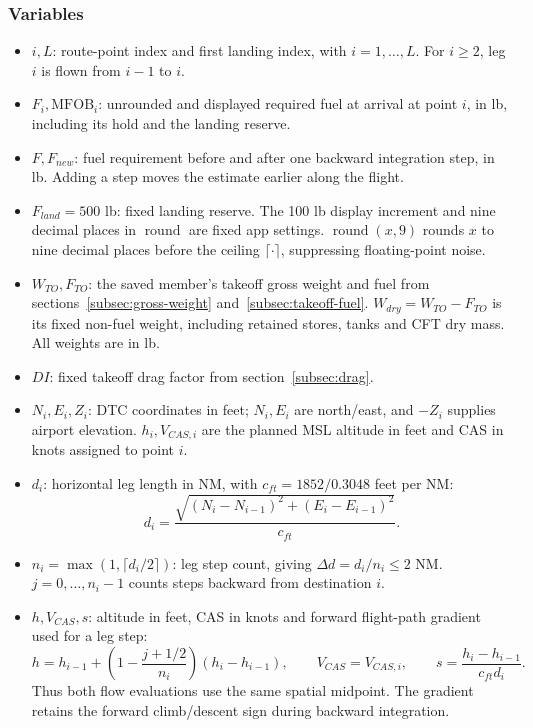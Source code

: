 \documentclass[10pt,a4paper]{amsart}
\DeclareMathOperator{\rnd}{round}
\begin{document}
\subsubsection*{Variables}
\begin{itemize}
\setlength{\itemsep}{0pt}
\setlength{\parsep}{0pt}
\item $i,L$: route-point index and first landing index, with
$i=1,\ldots,L$. For $i\geq2$, leg $i$ is flown from $i-1$ to $i$.
\item $F_i,\mathrm{MFOB}_i$: unrounded and displayed required fuel at
arrival at point $i$, in lb, including its hold and the landing reserve.
\item $F,F_{new}$: fuel requirement before and after one backward
integration step, in lb. Adding a step moves the estimate earlier
along the flight.
\item $F_{land}=500$ lb: fixed landing reserve.
The 100 lb display increment and nine decimal places in $\rnd$ are
fixed app settings. $\rnd(x,9)$ rounds $x$ to nine decimal places
before the ceiling $\lceil\cdot\rceil$, suppressing floating-point noise.
\item $W_{TO},F_{TO}$: the saved member's takeoff gross weight and fuel
from sections~\ref{subsec:gross-weight} and~\ref{subsec:takeoff-fuel}.
$W_{dry}=W_{TO}-F_{TO}$ is its fixed non-fuel weight, including retained
stores, tanks and CFT dry mass. All weights are in lb.
\item $DI$: fixed takeoff drag factor from section~\ref{subsec:drag}.
\item $N_i,E_i,Z_i$: DTC coordinates in feet; $N_i,E_i$ are north/east,
and $-Z_i$ supplies airport elevation. $h_i,V_{CAS,i}$ are the planned
MSL altitude in feet and CAS in knots assigned to point $i$.
\item $d_i$: horizontal leg length in NM, with
$c_{ft}=1852/0.3048$ feet per NM:
\[
 d_i=\frac{\sqrt{(N_i-N_{i-1})^2+(E_i-E_{i-1})^2}}{c_{ft}}.
\]
\item $n_i=\max(1,\lceil d_i/2\rceil)$: leg step count, giving
$\Delta d=d_i/n_i\leq2$ NM. $j=0,\ldots,n_i-1$ counts steps backward
from destination $i$.
\item $h,V_{CAS},s$: altitude in feet, CAS in knots and forward
flight-path gradient used for a leg step:
\[
 h=h_{i-1}+\left(1-\frac{j+1/2}{n_i}\right)(h_i-h_{i-1}),\qquad
 V_{CAS}=V_{CAS,i},\qquad
 s=\frac{h_i-h_{i-1}}{c_{ft}d_i}.
\]
Thus both flow evaluations use the same spatial midpoint. The gradient
retains the forward climb/descent sign during backward integration.

\end{itemize}
\end{document}
